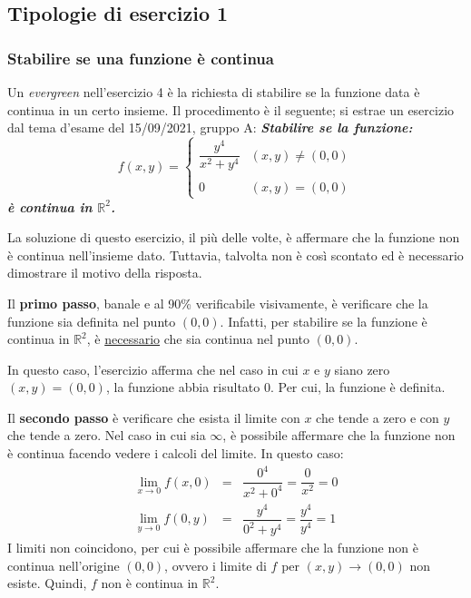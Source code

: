 \documentclass[a4paper]{article}
\begin{document}
	\subsection{Tipologie di esercizio 1}

	\subsubsection{Stabilire se una funzione è continua}

	Un \emph{evergreen} nell'esercizio 4 è la richiesta di stabilire se la funzione data è continua in un certo insieme. Il procedimento è il seguente; si estrae un esercizio dal tema d'esame del 15/09/2021, gruppo A: \textcolor{Green4}{\textbf{\emph{Stabilire se la funzione:}}
	\begin{equation*}
		f\left(x,y\right) = \begin{cases}
			\dfrac{y^{4}}{x^{2} + y^{4}} & \left(x,y\right) \ne \left(0,0\right) \\
			\\
			0	& \left(x,y\right) = \left(0,0\right)
		\end{cases}
	\end{equation*}
	\textbf{\emph{è continua in $\mathbb{R}^{2}$.}}}\newline

	\noindent
	La soluzione di questo esercizio, il più delle volte, è affermare che la funzione non è continua nell'insieme dato. Tuttavia, talvolta non è così scontato ed è necessario dimostrare il motivo della risposta.\newline
	
	\noindent
	Il \textbf{primo passo}, banale e al 90\% verificabile visivamente, è verificare che la funzione sia definita nel punto $\left(0,0\right)$. Infatti, per stabilire se la funzione è continua in $\mathbb{R}^{2}$, è \underline{necessario} che sia continua nel punto $\left(0,0\right)$.

	In questo caso, l'esercizio afferma che nel caso in cui $x$ e $y$ siano zero $\left(x,y\right) = \left(0,0\right)$, la funzione abbia risultato $0$. Per cui, la funzione è definita.\newline

	\noindent
	Il \textbf{secondo passo} è verificare che esista il limite con $x$ che tende a zero e con $y$ che tende a zero. Nel caso in cui sia $\infty$, è possibile affermare che la funzione non è continua facendo vedere i calcoli del limite. In questo caso:
	\begin{equation*}
		\begin{array}{rcl}
			\displaystyle\lim_{x \rightarrow 0} f\left(x,0\right) &=& \dfrac{0^{4}}{x^{2} + 0^{4}} = \dfrac{0}{x^{2}} = 0 \\ [1.5em]
			\displaystyle\lim_{y \rightarrow 0} f\left(0,y\right) &=& \dfrac{y^{4}}{0^{2} + y^{4}} = \dfrac{y^{4}}{y^{4}} = 1
		\end{array}
	\end{equation*}
	I limiti non coincidono, per cui è possibile affermare che la funzione non è continua nell'origine $\left(0,0\right)$, ovvero i limite di $f$ per $\left(x,y\right) \rightarrow \left(0,0\right)$ non esiste. Quindi, $f$ non è continua in $\mathbb{R}^{2}$.\newline
\end{document}

